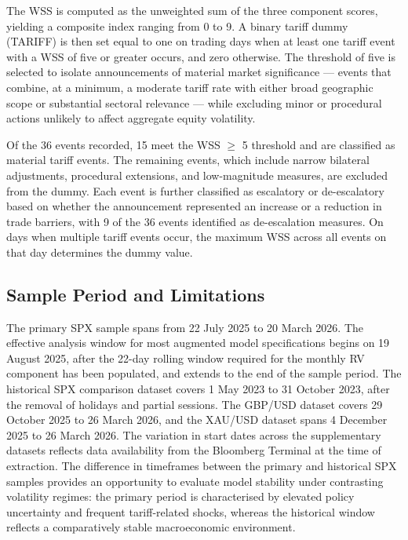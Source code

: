 \documentclass[12pt,a4paper]{report}
\begin{document}
The WSS is computed as the unweighted sum of the three component scores, yielding a composite index ranging from 0 to 9. A binary tariff dummy (TARIFF) is then set equal to one on trading days when at least one tariff event with a WSS of five or greater occurs, and zero otherwise. The threshold of five is selected to isolate announcements of material market significance --- events that combine, at a minimum, a moderate tariff rate with either broad geographic scope or substantial sectoral relevance --- while excluding minor or procedural actions unlikely to affect aggregate equity volatility.

Of the 36 events recorded, 15 meet the WSS $\geq$ 5 threshold and are classified as material tariff events. The remaining events, which include narrow bilateral adjustments, procedural extensions, and low-magnitude measures, are excluded from the dummy. Each event is further classified as escalatory or de-escalatory based on whether the announcement represented an increase or a reduction in trade barriers, with 9 of the 36 events identified as de-escalation measures. On days when multiple tariff events occur, the maximum WSS across all events on that day determines the dummy value.

\subsection{Sample Period and Limitations}
The primary SPX sample spans from 22 July 2025 to 20 March 2026. The effective analysis window for most augmented model specifications begins on 19 August 2025, after the 22-day rolling window required for the monthly RV component has been populated, and extends to the end of the sample period. The historical SPX comparison dataset covers 1 May 2023 to 31 October 2023, after the removal of holidays and partial sessions. The GBP/USD dataset covers 29 October 2025 to 26 March 2026, and the XAU/USD dataset spans 4 December 2025 to 26 March 2026. The variation in start dates across the supplementary datasets reflects data availability from the Bloomberg Terminal at the time of extraction. The difference in timeframes between the primary and historical SPX samples provides an opportunity to evaluate model stability under contrasting volatility regimes: the primary period is characterised by elevated policy uncertainty and frequent tariff-related shocks, whereas the historical window reflects a comparatively stable macroeconomic environment.
\end{document}
